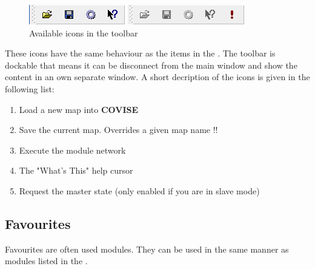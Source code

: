     
	  \latexonly
	  \begin{figure}[!htbp]
	  \hspace{3cm}
	  \begin{minipage}[b]{.4\linewidth}
   	 \includegraphics[scale=0.5]{mapeditor/pict/toolicons}
	  \end{minipage}
	  \hspace{1cm}
	  \begin{minipage}[b]{.4\linewidth}
   	 \includegraphics[scale=0.5]{mapeditor/pict/toolbar2}
	  \end{minipage}
	  \caption{Available icons in the toolbar}
	  \label{figtoolicons}
	  \end{figure}
	  \endlatexonly
	  
	 These icons have the same behaviour as the items in the {\mymenubar}. The toolbar is dockable that means it can be 
    disconnect from the main window and show the content in an own separate window. A short decription
	 of the icons is given in the following list:

	 \begin{enumerate}
	 \item Load a new map into {\bf COVISE}
	 \item Save the current map. Overrides a given map name !!
	 \item Execute the module network 
	 \item The "What's This" help cursor 
	 \item Request the master state (only enabled if you are in slave mode) 
	 \end{enumerate}





    \subsection{Favourites}

    Favourites are often used modules. They can be used in the same manner as modules listed in the \mymodulebrowser.
	 
    
